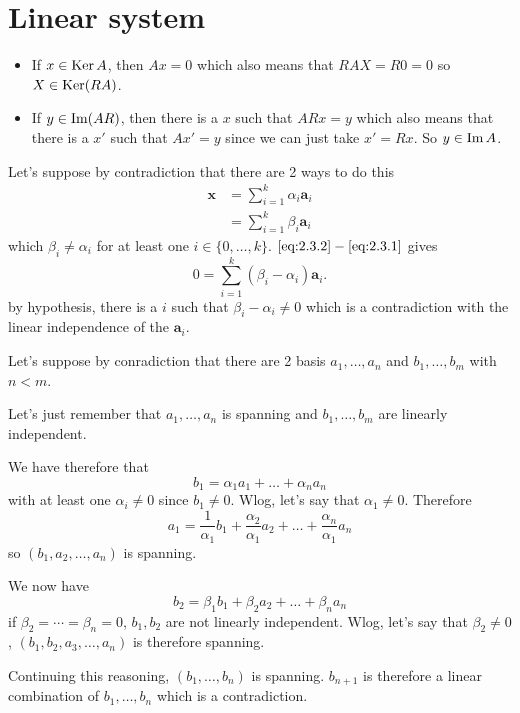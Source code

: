 \section{Linear system}
\nosolution

\begin{solution}
  \begin{itemize}
    \item If $x \in \operatorname{Ker} A$, then $Ax = 0$
      which also means that $RAX = R0 = 0$ so $X \in \operatorname{Ker}(RA)$.
    \item If $y \in \operatorname{Im}(AR)$, then there is a $x$
      such that $ARx = y$
      which also means that there is a $x'$ such that
      $Ax' = y$ since we can just take $x' = Rx$.
      So $y \in \operatorname{Im} A$.
  \end{itemize}
\end{solution}

\begin{solution}
  Let's suppose by contradiction that there are 2 ways
  to do this
  \begin{align}
    \label{eq:2.3.1}
    \mathbf{x} & = \sum_{i=1}^k \alpha_i \mathbf{a}_i\\
    \label{eq:2.3.2}
               & = \sum_{i=1}^k \beta_i \mathbf{a}_i
  \end{align}
  which $\beta_i \neq \alpha_i$ for at least one $i \in \{0, \ldots, k\}$.
  $\eqref{eq:2.3.2}-\eqref{eq:2.3.1}$ gives
  \[
    0 = \sum_{i=1}^k (\beta_i-\alpha_i) \mathbf{a}_i.
  \]
  by hypothesis, there is a $i$ such that $\beta_i-\alpha_i \neq 0$
  which is a contradiction with the linear independence of the $\mathbf{a}_i$.
\end{solution}

\begin{solution}
  Let's suppose by conradiction that there are 2
  basis $a_1, \ldots, a_n$ and $b_1, \ldots, b_m$ with $n < m$.

  Let's just remember that $a_1, \ldots, a_n$ is spanning
  and $b_1, \ldots, b_m$ are linearly independent.

  We have therefore that
  \[ b_1 = \alpha_1 a_1 + \ldots + \alpha_n a_n\]
  with at least one $\alpha_i \neq 0$ since $b_1 \neq 0$.
  Wlog, let's say that $\alpha_1 \neq 0$.
  Therefore
  \[ a_1 = \frac{1}{\alpha_1}b_1 + \frac{\alpha_2}{\alpha_1} a_2 + \ldots + \frac{\alpha_n}{\alpha_1} a_n\]
  so $(b_1, a_2, \ldots, a_n)$ is spanning.

  We now have
  \[ b_2 = \beta_1 b_1 + \beta_2 a_2 + \ldots + \beta_n a_n\]
  if $\beta_2 = \cdots = \beta_n = 0$, $b_1, b_2$ are not linearly independent.
  Wlog, let's say that $\beta_2 \neq 0$,
  $(b_1,b_2,a_3,\ldots,a_n)$ is therefore spanning.

  Continuing this reasoning, $(b_1,\ldots,b_n)$ is spanning.
  $b_{n+1}$ is therefore a linear combination of $b_1, \ldots, b_n$ which is a contradiction.
\end{solution}

